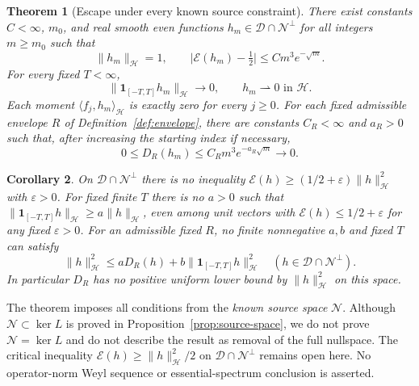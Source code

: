 \documentclass[11pt,a4paper]{article}
\newcommand{\HH}{\mathcal H}
\newcommand{\DD}{\mathcal D}
\newcommand{\EE}{\mathcal E}
\newcommand{\NN}{\mathcal N}
\newcommand{\ip}[2]{\langle #1,#2\rangle}
\newcommand{\norm}[1]{\lVert #1\rVert}
\newcommand{\abs}[1]{\lvert #1\rvert}
\newtheorem{theorem}{Theorem}[section]
\newtheorem{corollary}[theorem]{Corollary}
\theoremstyle{definition}
\theoremstyle{remark}
\numberwithin{equation}{section}
\begin{document}
\begin{theorem}[Escape under every known source constraint]\label{thm:escape}
There exist constants $C<\infty$, $m_0$, and real smooth even functions
$h_m\in\DD\cap\NN^\perp$ for all integers $m\ge m_0$ such that
\begin{equation}\label{eq:main-energy}
 \norm{h_m}_{\HH}=1,\qquad
 \abs{\EE(h_m)-\tfrac12}\le C m^3e^{-\sqrt m}.
\end{equation}
For every fixed $T<\infty$,
\begin{equation}\label{eq:main-local}
 \norm{\mathbf1_{[-T,T]}h_m}_{\HH}\longrightarrow0,
 \qquad h_m\rightharpoonup0\text{ in }\HH.
\end{equation}
Each moment $\ip{f_j}{h_m}_{\HH}$ is exactly zero for every $j\ge0$.
For each fixed admissible envelope $R$ of Definition~\ref{def:envelope},
there are constants $C_R<\infty$ and $a_R>0$ such that, after increasing
the starting index if necessary,
\begin{equation}\label{eq:main-ground}
 0\le D_R(h_m)\le C_R m^3e^{-a_R\sqrt m}\longrightarrow0.
\end{equation}
\end{theorem}

\begin{corollary}\label{cor:obstructions}
On $\DD\cap\NN^\perp$ there is no inequality
$\EE(h)\ge(1/2+\varepsilon)\norm h_{\HH}^2$ with $\varepsilon>0$.
For fixed finite $T$ there is no $a>0$ such that
$\norm{\mathbf1_{[-T,T]}h}_{\HH}\ge a\norm h_{\HH}$, even among unit
vectors with $\EE(h)\le1/2+\varepsilon$ for any fixed $\varepsilon>0$.
For an admissible fixed $R$, no finite nonnegative $a,b$ and fixed $T$
can satisfy
\begin{equation}\label{eq:impossible-observation}
 \norm h_{\HH}^2\le aD_R(h)+b\norm{\mathbf1_{[-T,T]}h}_{\HH}^2
 \quad(h\in\DD\cap\NN^\perp).
\end{equation}
In particular $D_R$ has no positive uniform lower bound by
$\norm h_{\HH}^2$ on this space.
\end{corollary}

The theorem imposes all conditions from the \emph{known source space}
$\NN$. Although $\NN\subset\ker L$ is proved in
Proposition~\ref{prop:source-space}, we do not prove $\NN=\ker L$ and
do not describe the result as removal of the full nullspace. The critical
inequality $\EE(h)\ge\norm h_{\HH}^2/2$ on $\DD\cap\NN^\perp$
remains open here. No operator-norm Weyl sequence or essential-spectrum
conclusion is asserted.
\end{document}
